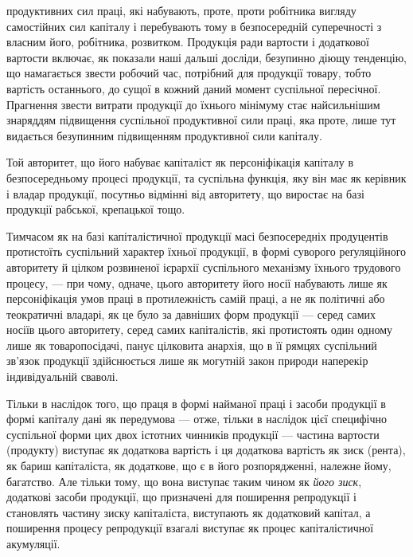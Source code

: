 \parcont{}  %
продуктивних сил праці, які набувають, проте, проти робітника вигляду самостійних
сил капіталу і перебувають тому в безпосередній суперечності з власним його,
робітника, розвитком. Продукція ради вартости і додаткової вартости включає,
як показали наші дальші досліди, безупинно діющу тенденцію, що намагається
звести робочий час, потрібний для продукції товару, тобто вартість останнього,
до сущої в кожний даний момент суспільної пересічної. Прагнення звести витрати
продукції до їхнього мінімуму стає найсильнішим знаряддям підвищення
суспільної продуктивної сили праці, яка проте, лише тут видається безупинним
підвищенням продуктивної сили капіталу.

Той авторитет, що його набуває капіталіст як персоніфікація капіталу в
безпосередньому процесі продукції, та суспільна функція, яку він має як керівник
і владар продукції, посутньо відмінні від авторитету, що виростає на базі
продукції рабської, крепацької тощо.

Тимчасом як на базі капіталістичної продукції масі безпосередніх продуцентів
протистоїть суспільний характер їхньої продукції, в формі суворого реґуляційного
авторитету й цілком розвиненої ієрархії суспільного механізму їхнього
трудового процесу, — при чому, одначе, цього авторитету його носії набувають
лише як персоніфікація умов праці в протилежність самій праці, а не як політичні
або теократичні владарі, як це було за давніших форм продукції — серед
самих носіїв цього авторитету, серед самих капіталістів, які протистоять один
одному лише як товаропосідачі, панує цілковита анархія, що в її рямцях суспільний
зв’язок продукції здійснюється лише як могутній закон природи наперекір
індивідуальній сваволі.

Тільки в наслідок того, що праця в формі найманої праці і засоби продукції
в формі капіталу дані як передумова — отже, тільки в наслідок цієї специфічно
суспільної форми цих двох істотних чинників продукції — частина вартости
(продукту) виступає як додаткова вартість і ця додаткова вартість як
зиск (рента), як бариш капіталіста, як додаткове, що є в його розпорядженні,
належне йому, багатство. Але тільки тому, що вона виступає таким чином як
\emph{його зиск}, додаткові засоби продукції, що призначені для поширення репродукції
і становлять частину зиску капіталіста, виступають як додатковий капітал,
а поширення процесу репродукції взагалі виступає як процес капіталістичної
акумуляції.

